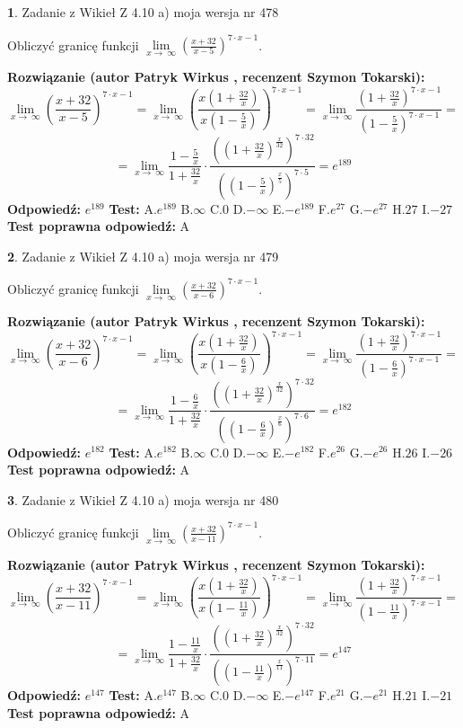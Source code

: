 \documentclass[12pt, a4paper]{article}
\theoremstyle{definition} %
\newtheorem{zad}{}
\newcommand{\zadStart}[1]{\begin{zad}#1\newline}
\newcommand{\zadStop}{\end{zad}}
\newcommand{\rozwStart}[2]{\noindent \textbf{Rozwiązanie (autor #1 , recenzent #2): }\newline}
\newcommand{\rozwStop}{\newline}
\newcommand{\odpStart}{\noindent \textbf{Odpowiedź:}\newline}
\newcommand{\odpStop}{\newline}
\newcommand{\testStart}{\noindent \textbf{Test:}\newline}
\newcommand{\testStop}{\newline}
\newcommand{\kluczStart}{\noindent \textbf{Test poprawna odpowiedź:}\newline}
\newcommand{\kluczStop}{\newline}
\begin{document}
\zadStart{Zadanie z Wikieł Z 4.10 a) moja wersja nr 478}

Obliczyć granicę funkcji  $\lim\limits_{x\to\ \infty}(\frac{x+32}{x-5})^{7\cdot x-1}$.
\zadStop
\rozwStart{Patryk Wirkus}{Szymon Tokarski}
$$\lim\limits_{x\to\ \infty}(\frac{x+32}{x-5})^{7\cdot x-1} = \lim\limits_{x\to\ \infty}(\frac{x(1+\frac{32}{x})}{x(1-\frac{5}{x})})^{7\cdot x-1}=\lim\limits_{x\to\ \infty}\frac{(1+\frac{32}{x})^{7\cdot x-1}}{(1-\frac{5}{x})^{7\cdot x-1}}=$$
$$=\lim\limits_{x\to\ \infty}\frac{1-\frac{5}{x}}{1+\frac{32}{x}}\cdot\frac{((1+\frac{32}{x})^{\frac{x}{32}})^{7\cdot32}}{((1-\frac{5}{x})^{\frac{x}{5}})^{7\cdot5}}=e^{189}$$
\rozwStop
\odpStart
$e^{189}$
\odpStop
\testStart
A.$e^{189}$ B.$\infty$ C.$0$ D.$-\infty$ E.$-e^{189}$
F.$e^{27}$ G.$-e^{27}$
H.$27$
I.$-27$
\testStop
\kluczStart
A
\kluczStop



\zadStart{Zadanie z Wikieł Z 4.10 a) moja wersja nr 479}

Obliczyć granicę funkcji  $\lim\limits_{x\to\ \infty}(\frac{x+32}{x-6})^{7\cdot x-1}$.
\zadStop
\rozwStart{Patryk Wirkus}{Szymon Tokarski}
$$\lim\limits_{x\to\ \infty}(\frac{x+32}{x-6})^{7\cdot x-1} = \lim\limits_{x\to\ \infty}(\frac{x(1+\frac{32}{x})}{x(1-\frac{6}{x})})^{7\cdot x-1}=\lim\limits_{x\to\ \infty}\frac{(1+\frac{32}{x})^{7\cdot x-1}}{(1-\frac{6}{x})^{7\cdot x-1}}=$$
$$=\lim\limits_{x\to\ \infty}\frac{1-\frac{6}{x}}{1+\frac{32}{x}}\cdot\frac{((1+\frac{32}{x})^{\frac{x}{32}})^{7\cdot32}}{((1-\frac{6}{x})^{\frac{x}{6}})^{7\cdot6}}=e^{182}$$
\rozwStop
\odpStart
$e^{182}$
\odpStop
\testStart
A.$e^{182}$ B.$\infty$ C.$0$ D.$-\infty$ E.$-e^{182}$
F.$e^{26}$ G.$-e^{26}$
H.$26$
I.$-26$
\testStop
\kluczStart
A
\kluczStop



\zadStart{Zadanie z Wikieł Z 4.10 a) moja wersja nr 480}

Obliczyć granicę funkcji  $\lim\limits_{x\to\ \infty}(\frac{x+32}{x-11})^{7\cdot x-1}$.
\zadStop
\rozwStart{Patryk Wirkus}{Szymon Tokarski}
$$\lim\limits_{x\to\ \infty}(\frac{x+32}{x-11})^{7\cdot x-1} = \lim\limits_{x\to\ \infty}(\frac{x(1+\frac{32}{x})}{x(1-\frac{11}{x})})^{7\cdot x-1}=\lim\limits_{x\to\ \infty}\frac{(1+\frac{32}{x})^{7\cdot x-1}}{(1-\frac{11}{x})^{7\cdot x-1}}=$$
$$=\lim\limits_{x\to\ \infty}\frac{1-\frac{11}{x}}{1+\frac{32}{x}}\cdot\frac{((1+\frac{32}{x})^{\frac{x}{32}})^{7\cdot32}}{((1-\frac{11}{x})^{\frac{x}{11}})^{7\cdot11}}=e^{147}$$
\rozwStop
\odpStart
$e^{147}$
\odpStop
\testStart
A.$e^{147}$ B.$\infty$ C.$0$ D.$-\infty$ E.$-e^{147}$
F.$e^{21}$ G.$-e^{21}$
H.$21$
I.$-21$
\testStop
\kluczStart
A
\kluczStop
\end{document}
